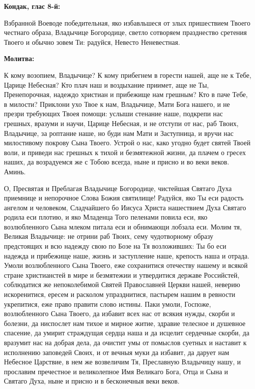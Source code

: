 \medskip


\bfseries Кондак, глас 8-й:\normalfont{}\nopagebreak


Взбранной Воеводе победительная, яко избавльшеся от злых пришествием Твоего честнаго образа, Владычице Богородице, светло сотворяем празднество сретения Твоего и обычно зовем Ти: радуйся, Невесто Неневестная.


\medskip


\bfseries Молитва:\normalfont{}\nopagebreak


К кому возопием, Владычице? К кому прибегнем в горести нашей, аще не к Тебе, Царице Небесная? Кто плач наш и воздыхание приимет, аще не Ты, Пренепорочная, надеждо христиан и прибежище нам грешным? Кто в паче Тебе, в милости? Приклони ухо Твое к нам, Владычице, Мати Бога нашего, и не презри требующих Твоея помощи: услыши стенание наше, подкрепи нас грешных, вразуми и научи, Царице Небесная, и не отступи от нас, раб Твоих, Владычице, за роптание наше, но буди нам Мати и Заступница, и вручи нас милостивому покрову Сына Твоего. Устрой о нас, како угодно будет святей Твоей воли, и приведи нас грешных к тихой и безмятежной жизни, да плачем о гресех наших, да возрадуемся же с Тобою всегда, ныне и присно и во веки веков. Аминь.


\bigskip\bigskip\mychapterending

 


О, Пресвятая и Преблагая Владычице Богородице, чистейшая Святаго Духа приемнице и непорочное Слова Божия святилище! Радуйся, яко Ты еси радость ангелом и человеком, Сладчайшего бо Иисуса Христа нашествием Духа Святаго родила еси плотию, и яко Младенца Того пеленами повила еси, яко возлюбленного Сына млеком питала еси и обнимающи лобзала еси. Молим тя, Великая Владычице: не отрини раб Твоих, сему чудотворному образу предстоящих и всю надежду свою по Бозе на Тя возложивших: Ты бо еси надежда и прибежище наше, жизнь и заступление наше, крепость наша и отрада. Умоли возлюбленного Сына Твоего, еже сохранитися отечеству нашему и всякой стране христианстей в мире и безмятежии и утвердитися державе Российстей, соблюдатися же непоколебимой Святей Православней Церкви нашей, неверию искоренитися, ересем и расколом упразднитися, пастырем нашим в ревности укрепитися, еже право правити слово истины. Паки умоли, Госпоже, возлюбленного Сына Твоего, да избавит всех нас от всякия нужды, скорби и болезни, да ниспослет нам тихое и мирное житие, здравие телесное и душевное спасение, да умирит страждущая сердца наша и да исцелит сердечные скорби, да вразумит нас на добрая дела, да очистит умы от помыслов суетных и наставит к исполнению заповедей Своих, и от вечныя муки да избавит, да дарует нам Небесное Царствие, в нем же возвеличим Тя, Преславную Владычицу нашу, и прославим пречестное и великолепное Имя Великаго Бога, Отца и Сына и Святаго Духа, ныне и присно и в бесконечныя веки веков.


